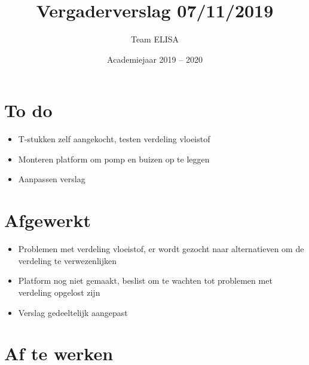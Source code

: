 \documentclass[a4paper,kulak]{kulakarticle} %
\date{Academiejaar 2019 -- 2020}
\title{Vergaderverslag 07/11/2019}
\author{Team ELISA}
\begin{document}
	
	\maketitle
	
	\section*{To do}
	
	\begin{itemize}
		\item T-stukken zelf aangekocht, testen verdeling vloeistof
		\item Monteren platform om pomp en buizen op te leggen
		\item Aanpassen verslag
		
	\end{itemize}
	
	\section*{Afgewerkt}
		\begin{itemize}
			\item Problemen met verdeling vloeistof, er wordt gezocht naar alternatieven om de verdeling te verwezenlijken
			\item Platform nog niet gemaakt, beslist om te wachten tot problemen met verdeling opgelost zijn
			\item Verslag gedeeltelijk aangepast
		\end{itemize}
	
	
	\section*{Af te werken}
	
	
\end{document}

